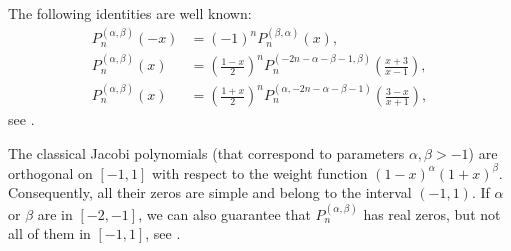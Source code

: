 \documentclass[reqno,11pt]{amsart}
\theoremstyle{remark}
\begin{document}
The following  identities are well known:
\begin{equation}\label{transfJacobi}
\begin{split}
P_n^{(\alpha, \beta)}(-x)& =(-1)^n P_n^{(\beta, \alpha)}(x), \\
P_n^{(\alpha, \beta)}(x) & =\left(\frac{1-x}{2}\right)^n P_n^{(-2 n-\alpha-\beta-1, \beta)}\left(\frac{x+3}{x-1}\right), \\
P_n^{(\alpha, \beta)}(x)& =\left(\frac{1+x}{2}\right)^n P_n^{(\alpha,-2 n-\alpha-\beta-1)}\left(\frac{3-x}{x+1}\right),
\end{split}
\end{equation}
see \cite[\S 4.22]{szego1975orthogonal}.

The classical Jacobi polynomials (that correspond to parameters $\alpha, \beta>-1$)  are orthogonal on $[-1,1]$ with respect to the weight function $(1-x)^\alpha(1+x)^\beta$. Consequently, all their zeros are simple and belong to the interval $(-1,1)$. If $\alpha$ or $\beta$ are in $[-2,-1]$, we can also guarantee that $P_n^{(\alpha, \beta)}$ has real zeros, but not all of them in $[-1,1]$, see \cite{driver2018zeros}. 
\end{document}
